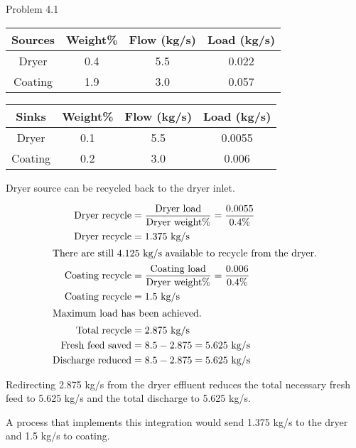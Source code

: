 \item Problem 4.1

\begin{center}
    \begin{tabular}{|c|c|c|c|}
        \hline
        Sources & Weight\% & Flow (kg/s) & Load (kg/s) \\
        \hline
        Dryer & 0.4 & 5.5 & 0.022 \\
        Coating & 1.9 & 3.0 & 0.057 \\
        \hline
    \end{tabular} 
    
    \begin{tabular}{|c|c|c|c|}
        \hline
        Sinks & Weight\% & Flow (kg/s) & Load (kg/s) \\
        \hline
        Dryer & 0.1 & 5.5 & 0.0055 \\
        Coating & 0.2 & 3.0 & 0.006 \\
        \hline
    \end{tabular} 
\end{center}

Dryer source can be recycled back to the dryer inlet.

\begin{align*}
    \text{Dryer recycle} &= \frac{\text{Dryer load}}{\text{Dryer weight\%}} = \frac{0.0055}{0.4\%} \\
    \text{Dryer recycle} &= 1.375 \text{ kg/s} \\
    \intertext{There are still 4.125 kg/s available to recycle from the dryer.}
    \text{Coating recycle} &= \frac{\text{Coating load}}{\text{Dryer weight\%}} = \frac{0.006}{0.4\%} \\
    \text{Coating recycle} &= 1.5 \text{ kg/s} \\
    \intertext{Maximum load has been achieved.}
    \text{Total recycle} &= 2.875 \text{ kg/s} \\
    \text{Fresh feed saved} &= 8.5 - 2.875 = 5.625 \text{ kg/s} \\
    \text{Discharge reduced} &= 8.5 - 2.875 = 5.625 \text{ kg/s} \\
\end{align*}

Redirecting 2.875 kg/s from the dryer effluent reduces the total necessary fresh feed to 5.625 kg/s and the total discharge to 5.625 kg/s. 

A process that implements this integration would send 1.375 kg/s to the dryer and 1.5 kg/s to coating.